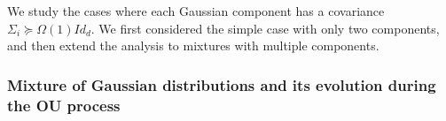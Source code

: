 We study the cases where each Gaussian component has a covariance $\Sigma_i \succeq \Omega(1)\!{Id}_d$. 
We first considered the simple case with only two components, and then extend the analysis to mixtures with multiple components.



\subsubsection{Mixture of Gaussian distributions and its evolution during the OU process}

